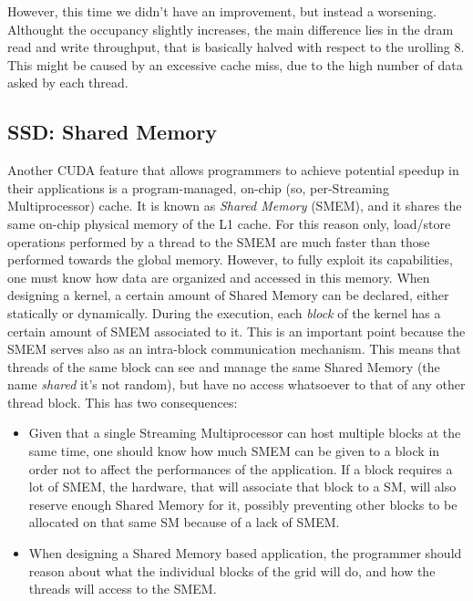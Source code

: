 \documentclass[12pt]{extarticle}
\begin{document}
However, this time we didn't have an improvement, but instead a worsening. Althought the occupancy slightly increases, the main difference lies in the dram read and write throughput, that is basically halved with respect to the urolling 8. This might be caused by an excessive cache miss, due to the high number of data asked by each thread. 
\subsection{SSD: Shared Memory}
Another CUDA feature that allows programmers to achieve potential speedup in their applications is a program-managed, on-chip (so, per-Streaming Multiprocessor) cache. It is known as \emph{Shared Memory} (SMEM), and it shares the same on-chip physical memory of the L1 cache. For this reason only, load/store operations performed by a thread to the SMEM are much faster than those performed towards the global memory. However, to fully exploit its capabilities, one must know how data are organized and accessed in this memory.\newline
When designing a kernel, a certain amount of Shared Memory can be declared, either statically or dynamically. During the execution, each \emph{block} of the kernel has a certain amount of SMEM associated to it. This is an important point because the SMEM serves also as an intra-block communication mechanism. This means that threads of the same block can see and manage the same Shared Memory (the name \emph{shared} it's not random), but have no access whatsoever to that of any other thread block. This has two consequences:
\begin{itemize}
    \item Given that a single Streaming Multiprocessor can host multiple blocks at the same time, one should know how much SMEM can be given to a block in order not to affect the performances of the application. If a block requires a lot of SMEM, the hardware, that will associate that block to a SM, will also reserve enough Shared Memory for it, possibly preventing other blocks to be allocated on that same SM because of a lack of SMEM.
    \item When designing a Shared Memory based application, the programmer should reason about what the individual blocks of the grid will do, and how the threads will access to the SMEM.
\end{itemize}
\end{document}
